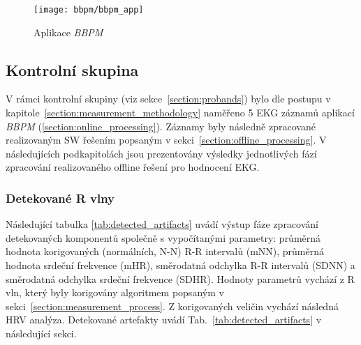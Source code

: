 \begin{figure}[H]
	\begin{center}
		\texttt{[image: bbpm/bbpm\_app]}
		\caption{Aplikace \textit{BBPM}}
		\label{fig:results_bbpm}
	\end{center}
\end{figure}

\clearpage

\subsection{Kontrolní skupina}
\label{sections:results_probands}
V rámci kontrolní skupiny (viz sekce~\ref{section:probands}) bylo dle postupu v
kapitole~\ref{section:measurement_methodology} naměřeno 5 EKG záznamů aplikací
\textit{BBPM} (\ref{section:online_processing}). Záznamy byly následně
zpracované realizovaným SW řešením popsaným v
sekci~\ref{section:offline_processing}. V následujících podkapitolách jsou
prezentovány výsledky jednotlivých fází zpracování realizovaného offline řešení
pro hodnocení EKG.

\subsubsection{Detekované R vlny}
Následující tabulka \ref{tab:detected_artifacts} uvádí výstup fáze zpracování
detekovaných komponentů společně s vypočítanými parametry: průměrná hodnota
korigovaných (normálních, N-N) R-R intervalů (mNN), průměrná hodnota srdeční
frekvence (mHR), směrodatná odchylka R-R intervalů (SDNN) a směrodatná odchylka
srdeční frekvence (SDHR). Hodnoty parametrů vychází z R vln, který byly
korigovány algoritmem popsaným v sekci~\ref{section:measurement_process}. Z
korigovaných veličin vychází následná HRV analýza. Detekované artefakty uvádí
Tab.~\ref{tab:detected_artifacts} v následující sekci.

